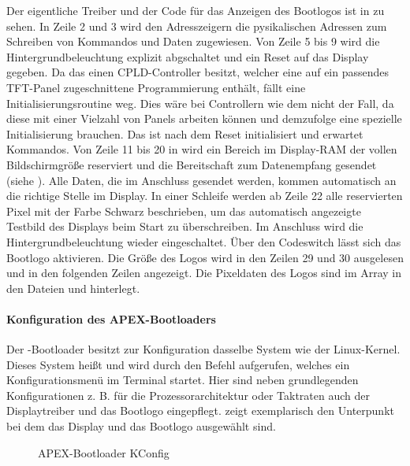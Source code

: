 Der eigentliche Treiber und der Code für das Anzeigen des Bootlogos ist in  zu sehen. In Zeile 2 und 3 wird den Adresszeigern die pysikalischen Adressen zum Schreiben von Kommandos und Daten zugewiesen. Von Zeile 5 bis 9 wird die Hintergrundbeleuchtung explizit abgschaltet und ein Reset auf das Display gegeben. Da das  einen CPLD-Controller besitzt, welcher eine auf ein passendes TFT-Panel zugeschnittene Programmierung enthält, fällt eine Initialisierungsroutine weg. Dies wäre bei Controllern wie dem  nicht der Fall, da diese mit einer Vielzahl von Panels arbeiten können und demzufolge eine spezielle Initialisierung brauchen. Das  ist nach dem Reset initialisiert und erwartet Kommandos. Von Zeile 11 bis 20 in  wird ein Bereich im Display-RAM der vollen Bildschirmgröße reserviert und die Bereitschaft zum Datenempfang gesendet (siehe ). Alle Daten, die im Anschluss gesendet werden, kommen automatisch an die richtige Stelle im Display. In einer Schleife werden ab Zeile 22 alle reservierten Pixel mit der Farbe Schwarz beschrieben, um das automatisch angezeigte Testbild des Displays beim Start zu überschreiben. Im Anschluss wird die Hintergrundbeleuchtung wieder eingeschaltet. Über den Codeswitch  lässt sich das Bootlogo aktivieren. Die Größe des Logos wird in den Zeilen 29 und 30 ausgelesen und in den folgenden Zeilen angezeigt. Die Pixeldaten des Logos sind im Array  in den Dateien  und  hinterlegt.


\paragraph{Konfiguration des APEX-Bootloaders}
\label{cha:config_apex}
Der -Bootloader besitzt zur Konfiguration dasselbe System wie der Linux-Kernel. Dieses System heißt  und wird durch den Befehl  aufgerufen, welches ein Konfigurationsmenü im Terminal startet. Hier sind neben grundlegenden Konfigurationen z. B. für die Prozessorarchitektur oder Taktraten auch der Displaytreiber und das Bootlogo eingepflegt.  zeigt exemplarisch den Unterpunkt  bei dem das Display  und das Bootlogo ausgewählt sind. 

\begin{figure}[tbph]
	\centering
{}
	\caption{APEX-Bootloader KConfig}
	\label{fig:apex_config}
\end{figure}
\newpage

